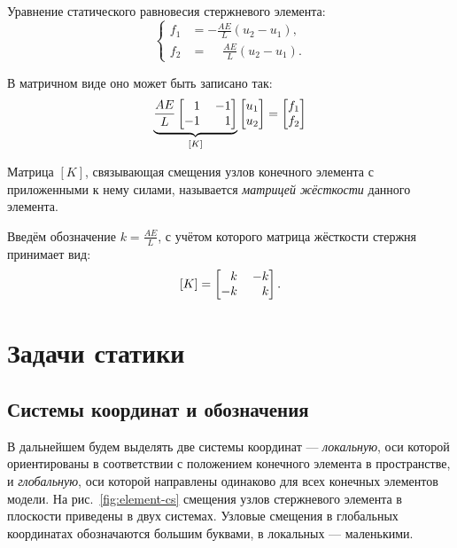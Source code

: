 \documentclass[10pt]{article}
\numberwithin{equation}{section}
\newcommand{\neword}{\emph}
\newcommand{\matr}[1]{[#1]}
\newcommand{\figref}[1]{рис. \ref{#1}}
\newcommand{\mm}{\llap{$-$}}
\newcommand{\phm}{\phantom{-}}
\begin{document}
Уравнение статического равновесия стержневого элемента:
\begin{equation}
  \begin{cases}
    f_1 &= -\frac{AE}{L}(u_2-u_1),\\
    f_2 &= \phm\frac{AE}{L}(u_2-u_1).
  \end{cases}
\end{equation}

В матричном виде оно может быть записано так:
\begin{equation}
  \label{eq:bar-equil}
  \underbrace{
  \frac{AE}{L}
  \begin{bmatrix}
    \phm{}1 && \mm1\\
    -1 && 1
  \end{bmatrix}}_{\matr{K}}
  \begin{bmatrix}
    u_1\\
    u_2
  \end{bmatrix}
  =
  \begin{bmatrix}
    f_1\\
    f_2
  \end{bmatrix}
\end{equation}

Матрица $\matr{K}$, связывающая смещения узлов конечного элемента с
приложенными к нему силами, называется \neword{матрицей жёсткости}
данного элемента. 

Введём обозначение $k = \frac{AE}{L}$, с учётом которого матрица
жёсткости стержня принимает вид:
\begin{equation}
  \label{eq:bar-stiffness}
  \matr{K} =
  \begin{bmatrix}
    \phm{}k&& \mm k\\
    -k && k
  \end{bmatrix}.
\end{equation}

\clearpage
\section{Задачи статики}

\subsection{Системы координат и обозначения}
\label{sec:notation}

В дальнейшем будем выделять две системы координат —
\neword{локальную}, оси которой ориентированы в соответствии с
положением конечного элемента в пространстве, и \neword{глобальную},
оси которой направлены одинаково для всех конечных элементов модели.
На \figref{fig:element-cs} смещения узлов стержневого элемента в
плоскости приведены в двух системах. Узловые смещения в глобальных
координатах обозначаются большим буквами, в локальных — маленькими.
\end{document}
